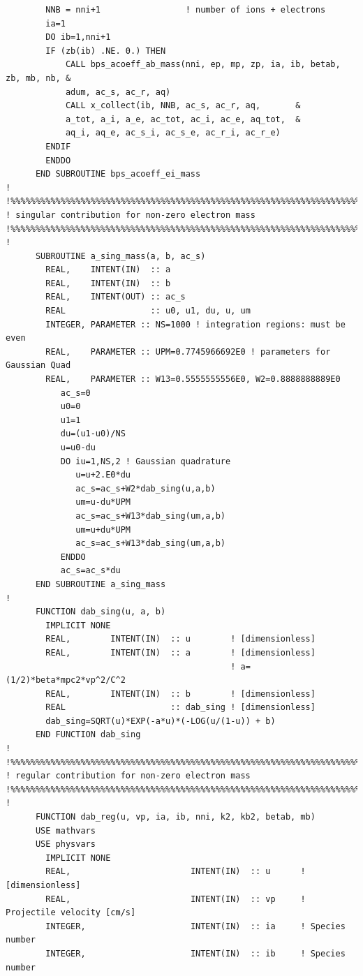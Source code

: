 \documentclass[preprint,12pt,eqsecnum,nofootinbib,amsmath,amssymb]{revtex4}
\begin{document}
{\begin{verbatim}
        NNB = nni+1                 ! number of ions + electrons
        ia=1
        DO ib=1,nni+1
        IF (zb(ib) .NE. 0.) THEN
            CALL bps_acoeff_ab_mass(nni, ep, mp, zp, ia, ib, betab, zb, mb, nb, &
            adum, ac_s, ac_r, aq)
            CALL x_collect(ib, NNB, ac_s, ac_r, aq,       &
            a_tot, a_i, a_e, ac_tot, ac_i, ac_e, aq_tot,  &
            aq_i, aq_e, ac_s_i, ac_s_e, ac_r_i, ac_r_e)
        ENDIF
        ENDDO
      END SUBROUTINE bps_acoeff_ei_mass
!
!%%%%%%%%%%%%%%%%%%%%%%%%%%%%%%%%%%%%%%%%%%%%%%%%%%%%%%%%%%%%%%%%%%%%%%%
! singular contribution for non-zero electron mass
!%%%%%%%%%%%%%%%%%%%%%%%%%%%%%%%%%%%%%%%%%%%%%%%%%%%%%%%%%%%%%%%%%%%%%%%
!
      SUBROUTINE a_sing_mass(a, b, ac_s)
        REAL,    INTENT(IN)  :: a
        REAL,    INTENT(IN)  :: b
        REAL,    INTENT(OUT) :: ac_s
        REAL                 :: u0, u1, du, u, um
        INTEGER, PARAMETER :: NS=1000 ! integration regions: must be even
        REAL,    PARAMETER :: UPM=0.7745966692E0 ! parameters for Gaussian Quad
        REAL,    PARAMETER :: W13=0.5555555556E0, W2=0.8888888889E0
           ac_s=0
           u0=0
           u1=1
           du=(u1-u0)/NS
           u=u0-du
           DO iu=1,NS,2 ! Gaussian quadrature
              u=u+2.E0*du
              ac_s=ac_s+W2*dab_sing(u,a,b)
              um=u-du*UPM
              ac_s=ac_s+W13*dab_sing(um,a,b)
              um=u+du*UPM
              ac_s=ac_s+W13*dab_sing(um,a,b)
           ENDDO
           ac_s=ac_s*du
      END SUBROUTINE a_sing_mass
!
      FUNCTION dab_sing(u, a, b)
        IMPLICIT NONE
        REAL,        INTENT(IN)  :: u        ! [dimensionless]
        REAL,        INTENT(IN)  :: a        ! [dimensionless] 
                                             ! a=(1/2)*beta*mpc2*vp^2/C^2
        REAL,        INTENT(IN)  :: b        ! [dimensionless]
        REAL                     :: dab_sing ! [dimensionless]
        dab_sing=SQRT(u)*EXP(-a*u)*(-LOG(u/(1-u)) + b)
      END FUNCTION dab_sing
!
!%%%%%%%%%%%%%%%%%%%%%%%%%%%%%%%%%%%%%%%%%%%%%%%%%%%%%%%%%%%%%%%%%%%%%%%
! regular contribution for non-zero electron mass
!%%%%%%%%%%%%%%%%%%%%%%%%%%%%%%%%%%%%%%%%%%%%%%%%%%%%%%%%%%%%%%%%%%%%%%%
!
      FUNCTION dab_reg(u, vp, ia, ib, nni, k2, kb2, betab, mb)
      USE mathvars
      USE physvars
        IMPLICIT NONE
        REAL,                        INTENT(IN)  :: u      ! [dimensionless]
        REAL,                        INTENT(IN)  :: vp     ! Projectile velocity [cm/s]
        INTEGER,                     INTENT(IN)  :: ia     ! Species number
        INTEGER,                     INTENT(IN)  :: ib     ! Species number

\end{verbatim}}
\end{document}
